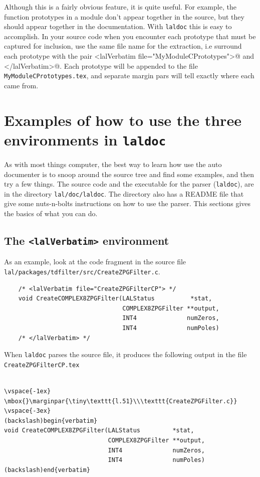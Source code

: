 \documentclass[oneside]{book}
\begin{document}
Although this is a fairly obvious feature, it is quite useful.  For
example, the function prototypes in a module don't appear together in
the source, but they should appear together in the documentation.
With {\texttt {laldoc}} this is easy to accomplish. In your source
code when you encounter each prototype that must be captured for
inclusion, use the same file name for the extraction, i.e surround
each prototype with
the pair {\verb@<lalVerbatim file="MyModuleCPrototypes">@}  and
{\verb@</lalVerbatim>@}.  Each prototype will be appended to the file
{\tt MyModuleCPrototypes.tex}, and separate margin pars will tell
exactly where each came from.





\section{Examples of how to use the three environments in {\texttt {laldoc}} }

As with most things computer, the best way to learn how use the auto
documenter is to snoop around the source tree and find some examples,
and then try a few things.  The source code and the executable for the
parser ({\tt laldoc}), are in the directory {\tt lal/doc/laldoc}.  The
directory also has a README file that give some nuts-n-bolts
instructions on how to use the parser.  This sections gives the basics
of what you can do.


\subsection{The {\texttt {<lalVerbatim>} }  environment }

As an example, look at the code fragment in the source file
\texttt{lal/packages/tdfilter/src/CreateZPGFilter.c}.

\begin{verbatim}
    /* <lalVerbatim file="CreateZPGFilterCP"> */
    void CreateCOMPLEX8ZPGFilter(LALStatus          *stat,
                                 COMPLEX8ZPGFilter **output,
                                 INT4              numZeros,
                                 INT4              numPoles)
    /* </lalVerbatim> */
\end{verbatim}
When {\tt laldoc} parses the source file, it produces the following
output in the file {\tt CreateZPGFilterCP.tex}

\begin{verbatim}

\vspace{-1ex}
\mbox{}\marginpar{\tiny\texttt{l.51}\\\texttt{CreateZPGFilter.c}}
\vspace{-3ex}
(backslash)begin{verbatim}
void CreateCOMPLEX8ZPGFilter(LALStatus         *stat,
                             COMPLEX8ZPGFilter **output,
                             INT4              numZeros,
                             INT4              numPoles)
(backslash)end{verbatim}
\end{verbatim}
\end{document}
